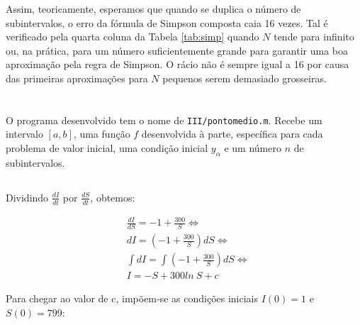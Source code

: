 \documentclass[portuguese, a4paper]{article}
\newcommand\tu[0]{\textunderscore}
\begin{document}
	\par
	Assim, teoricamente, esperamos que quando se duplica o número de subintervalos, o erro da fórmula de Simpson composta caia 16 vezes. Tal é verificado pela quarta coluna da Tabela \ref{tab:simp} quando $N$ tende para infinito ou, na prática, para um número suficientemente grande para garantir uma boa aproximação pela regra de Simpson. O rácio não é sempre igual a 16 por causa das primeiras aproximações para $N$ pequenos serem demasiado grosseiras.

\newpage
\section{} \label{sec:III}
	\subsection{} \label{sec:III.1}
	\par
	O programa desenvolvido tem o nome de \texttt{III/ponto\tu medio.m}. Recebe um intervalo
	$[a,b]$, uma função $f$ desenvolvida à parte, específica para cada problema de valor inicial,
	uma condição inicial $ y_\alpha $ e um número $n$ de subintervalos.

	\subsection{} \label{sec:III.2}
		\subsubsection{} \label{sec:III.2a)}
		\par
		Dividindo $\frac{dI}{dt}$ por $\frac{dS}{dt}$, obtemos:

		\begin{equation}
		\begin{split}
			& \frac{dI}{dS} = -1 + \frac{300}{S} \Leftrightarrow \\
			& dI = \left(-1 + \frac{300}{S}\right)dS \Leftrightarrow \\
			& \int dI = \int\left(-1 + \frac{300}{S}\right)dS \Leftrightarrow \\
			& I = -S + 300ln~S + c
		\end{split}
		\end{equation}

		\par
		Para chegar ao valor de c, impõem-se as condições iniciais $I(0) = 1$ e $S(0) = 799$:
\end{document}
